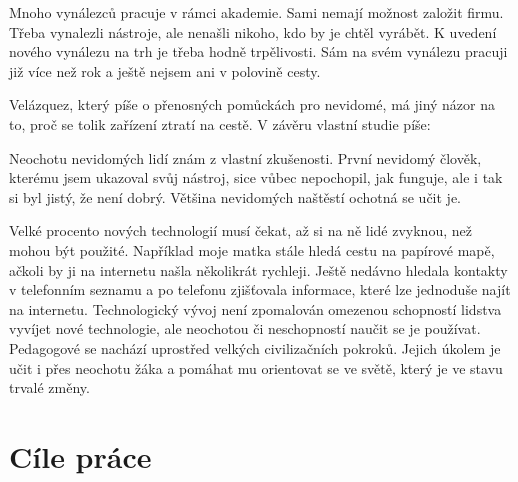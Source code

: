 Mnoho vynálezců pracuje v rámci akademie. Sami nemají možnost založit firmu. Třeba vynalezli nástroje, ale nenašli nikoho, kdo by je chtěl vyrábět. K uvedení nového vynálezu na trh je třeba hodně trpělivosti. Sám na svém vynálezu pracuji již více než rok a ještě nejsem ani v polovině cesty.

Velázquez, který píše o přenosných pomůckách pro nevidomé, má jiný názor na to, proč se tolik zařízení ztratí na cestě.  V závěru vlastní studie píše:
\em
{}\em  \citep[str. 15, přeložený z angičtiny]{velazquez2010wearable}%

Neochotu nevidomých lidí znám z vlastní zkušenosti. První nevidomý člověk, kterému jsem ukazoval svůj nástroj, sice vůbec nepochopil, jak funguje, ale i tak si byl jistý, že není dobrý. Většina nevidomých naštěstí ochotná se učit je.

Velké procento nových technologií musí čekat, až si na ně lidé zvyknou, než mohou být použité.  Například moje matka stále hledá cestu na papírové mapě, ačkoli by ji na internetu našla několikrát rychleji.  Ještě nedávno hledala kontakty v telefonním seznamu a po telefonu zjišťovala informace, které lze jednoduše najít na internetu.  Technologický vývoj není zpomalován omezenou schopností lidstva vyvíjet nové technologie, ale neochotou či neschopností naučit se je používat.  Pedagogové se nachází uprostřed velkých civilizačních pokroků.  Jejich úkolem je učit i přes neochotu žáka a pomáhat mu orientovat se ve světě, který je ve stavu trvalé změny.

\section{Cíle práce}

